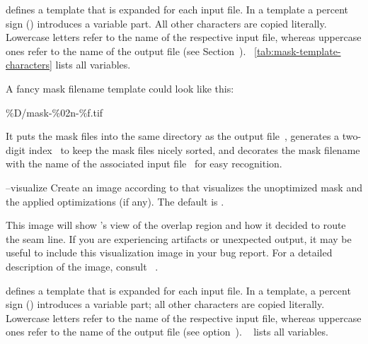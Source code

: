 \begin{codelist}
  \begin{geeknote}
     defines a template that is expanded for each input file.  In a
    template a percent sign (\sample{\%}) introduces a variable part.  All other characters are
    copied literally.  Lowercase letters refer to the name of the respective input file, whereas
    uppercase ones refer to the name of the output file (see
    Section~).  \tableName~\ref{tab:mask-template-characters} lists
    all variables.

    A fancy mask filename template could look like this:

    \begin{literal}
      \%D/mask-\%02n-\%f.tif
    \end{literal}

    It puts the mask files into the same directory as the output file~, generates a
    two-digit index~ to keep the mask files nicely sorted, and decorates the mask
    filename with the name of the associated input file~ for easy recognition.
  \end{geeknote}


  \label{opt:visualize}%
\item[--visualize\optional{=\metavar{VISUALIZE-TEMPLATE}}]\itemend
  Create an image according to  that visualizes the unoptimized mask
  and the applied optimizations (if any).  The default is
  \mbox{}.

  This image will show \App{}'s view of the overlap region and how it decided to route the seam
  line.  If you are experiencing artifacts or unexpected output, it may be useful to include
  this visualization image in your bug report.  For a detailed description of the image, consult
  \chapterName~.

  \begin{geeknote}
     defines a template that is expanded for each input file.  In a
    template, a percent sign (\sample{\%}) introduces a variable part; all other characters are
    copied literally.  Lowercase letters refer to the name of the respective input file, whereas
    uppercase ones refer to the name of the output file (see
    option~).
    \tableName~ lists all variables.
  \end{geeknote}
\end{codelist}







